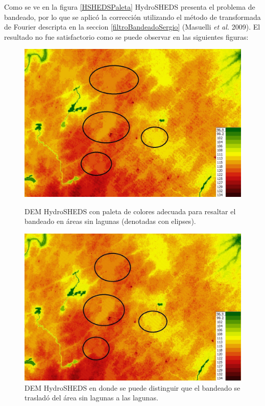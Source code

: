 \documentclass[10pt,a4paper, twoside]{report}
\begin{document}
Como se ve en la figura \ref{HSHEDSPaleta} HydroSHEDS presenta el problema de bandeado, por lo que se aplicó la corrección utilizando el método de transformada de Fourier descripta en la seccion \ref{filtroBandeadoSergio} (Masuelli \textit{et al.} 2009). El resultado no fue satisfactorio como se puede observar en las siguientes figuras:

\begin{figure}[!htb]
   \begin{minipage}{0.48\textwidth}
			\centering
			\includegraphics[width=1.0\linewidth]{imagenes/HydroSHEDSBandeadoZoom.jpg}
			\caption{DEM HydroSHEDS con paleta de colores adecuada para resaltar el bandeado en áreas sin lagunas (denotadas con elipses).}
			\label{HydroSHEDSBandeadoZoom}
   \end{minipage}\hfill
   \begin {minipage}{0.48\textwidth}
			\centering
			\includegraphics[width=1.0\linewidth]{imagenes/HydroSHEDSBandeadoZoomFourier.jpg}
			\caption{DEM HydroSHEDS en donde se puede distinguir que el bandeado se trasladó del área sin lagunas a las lagunas.}
			\label{HydroSHEDSBandeadoZoomFourier}
   \end{minipage}
\end{figure}
\end{document}
